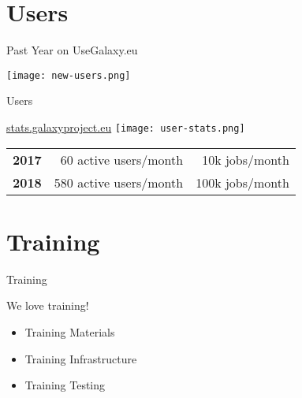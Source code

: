 \documentclass[12pt]{euslides}
\begin{document}

\section{Users}
\begin{frame}{Past Year on UseGalaxy.eu}
	\begin{center}
	\texttt{[image: new-users.png]}
	\end{center}
\end{frame}

\begin{frame}{Users}
	\begin{center}
	\url{stats.galaxyproject.eu}
	\texttt{[image: user-stats.png]}
	\end{center}

	\begin{tabular}{rrr}
		\textbf{2017} &  60 active users/month &  10k jobs/month\\
		\textbf{2018} & 580 active users/month & 100k jobs/month
	\end{tabular}
\end{frame}

\section{Training}
\begin{frame}{Training}
	\begin{center}
		We love training!

		\begin{itemize}
			\item Training Materials
			\item Training Infrastructure
			\item Training Testing
		\end{itemize}
	\end{center}
\end{frame}
\end{document}

